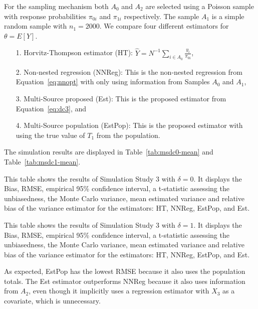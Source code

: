 \documentclass[12pt]{article}
\begin{document}
For the sampling mechanism both $A_0$ and $A_2$ are selected using a Poisson
sample with response probabilities $\pi_{0i}$ and $\pi_{1i}$ respectively. The
sample $A_1$ is a simple random sample with $n_1 = 2000$. We compare four
different estimators for $\theta = E[Y]$.
\begin{itemize}
  \item[1.] Horvitz-Thompson estimator (HT): $\hat Y = N^{-1} \sum_{i \in A_0}
    \frac{y_i}{\pi_{0i}}$,
  \item[2.] Non-nested regression (NNReg): This is the non-nested regression from
    Equation~\eqref{eq:nnopt} with only using information from Samples $A_0$ and
    $A_1$,
  \item[3.] Multi-Source proposed (Est): This is the proposed estimator from
    Equation~\eqref{eq:dc3}, and
  \item[4.] Multi-Source population (EstPop): This is the proposed estimator with
    using the true value of $T_1$ from the population.
\end{itemize}
The simulation results are displayed in Table~\ref{tab:msdc0-mean} and
Table~\ref{tab:msdc1-mean}.

\begin{table}[ht!]
  \centering
  
\caption{This table shows the results of Simulation Study 3 with $\delta = 0$.
  It displays the Bias, RMSE, empirical 95\% confidence interval, a t-statistic
  assessing the unbiasedness, the Monte Carlo variance, mean estimated variance
  and relative bias of the variance estimator for the estimators: HT, NNReg,
  EstPop, and Est.}
\label{tab:msdc0-mean}
\end{table}

\begin{table}[ht!]
  \centering
  
\caption{This table shows the results of Simulation Study 3 with $\delta = 1$.
  It displays the Bias, RMSE, empirical 95\% confidence interval, a t-statistic
  assessing the unbiasedness, the Monte Carlo variance, mean estimated variance
  and relative bias of the variance estimator for the estimators: HT, NNReg,
  EstPop, and Est.}
\label{tab:msdc1-mean}
\end{table}

As expected, EstPop has the lowest RMSE because it also uses the population
totals. The Est estimator outperforms
NNReg because it also uses information from $A_2$, even though it implicitly
uses a regression estimator with $X_3$ as a covariate, which is unnecessary.
\end{document}
